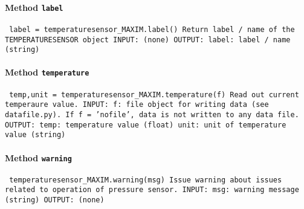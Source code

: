 \paragraph{Method \texttt{label}}
\vspace{1ex}
\texttt{\newline
label = temperaturesensor_MAXIM.label()\newline
\newline
Return label / name of the TEMPERATURESENSOR object\newline
\newline
INPUT:\newline
(none)\newline
\newline
OUTPUT:\newline
label: label / name (string)\newline
\newline
}

\paragraph{Method \texttt{temperature}}
\vspace{1ex}
\texttt{\newline
temp,unit = temperaturesensor_MAXIM.temperature(f)\newline
\newline
Read out current temperaure value.\newline
\newline
INPUT:\newline
f: file object for writing data (see datafile.py). If f = 'nofile', data is not written to any data file.\newline
\newline
OUTPUT:\newline
temp: temperature value (float)\newline
unit: unit of temperature value (string)\newline
\newline
}

\paragraph{Method \texttt{warning}}
\vspace{1ex}
\texttt{\newline
temperaturesensor_MAXIM.warning(msg)\newline
\newline
Issue warning about issues related to operation of pressure sensor.\newline
\newline
INPUT:\newline
msg: warning message (string)\newline
\newline
OUTPUT:\newline
(none)\newline
\newline
}

